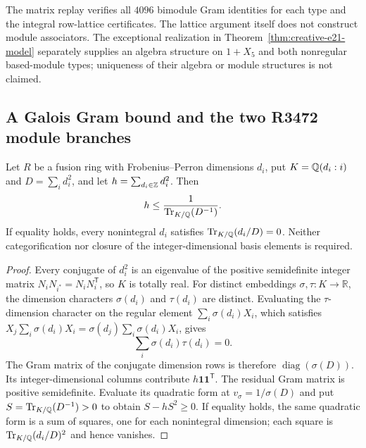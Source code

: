 The matrix replay verifies all $4096$ bimodule Gram identities for
each type and the integral row-lattice certificates. The lattice argument itself does not construct module associators.
The exceptional realization in Theorem~\ref{thm:creative-e21-model}
separately supplies an algebra structure on $1+X_5$ and both
nonregular based-module types; uniqueness of their algebra or module
structures is not claimed.

\subsection{A Galois Gram bound and the two R3472 module branches}
\label{subsec:creative-r3472-gram}

\begin{lemma}
\label{lem:creative-galois-gram}
Let $R$ be a fusion ring with Frobenius--Perron dimensions $d_i$, put
$K=\mathbb Q(d_i:i)$ and $D=\sum_i d_i^2$, and let
$h=\sum_{d_i\in\mathbb Z}d_i^2$. Then
\[
 h\leq \frac1{\operatorname{Tr}_{K/\mathbb Q}(D^{-1})}.
\]
If equality holds, every nonintegral $d_i$ satisfies
$\operatorname{Tr}_{K/\mathbb Q}(d_i/D)=0$.
Neither categorification nor closure of the integer-dimensional basis
elements is required.
\end{lemma}
\begin{proof}
Every conjugate of $d_i^2$ is an eigenvalue of the positive semidefinite
integer matrix $N_iN_{i^*}=N_iN_i^{\mathsf T}$, so $K$ is totally real.
For distinct embeddings $\sigma,\tau:K\longrightarrow\mathbb R$, the
dimension characters $\sigma(d_i)$ and $\tau(d_i)$ are distinct.
Evaluating the $\tau$-dimension character on the regular element
$\sum_i\sigma(d_i)X_i$, which satisfies
$X_j\sum_i\sigma(d_i)X_i=\sigma(d_j)\sum_i\sigma(d_i)X_i$, gives
\[
 \sum_i\sigma(d_i)\tau(d_i)=0.
\]
The Gram matrix of the conjugate dimension rows is therefore
$\operatorname{diag}(\sigma(D))$. Its integer-dimensional columns
contribute $h\mathbf1\mathbf1^{\mathsf T}$. The residual Gram matrix
is positive semidefinite. Evaluate its quadratic form at
$v_\sigma=1/\sigma(D)$ and put
$S=\operatorname{Tr}_{K/\mathbb Q}(D^{-1})>0$ to obtain $S-hS^2\geq0$.
If equality holds, the same quadratic form is a sum of squares, one
for each nonintegral dimension; each square is
$\operatorname{Tr}_{K/\mathbb Q}(d_i/D)^2$ and hence vanishes.
\end{proof}

